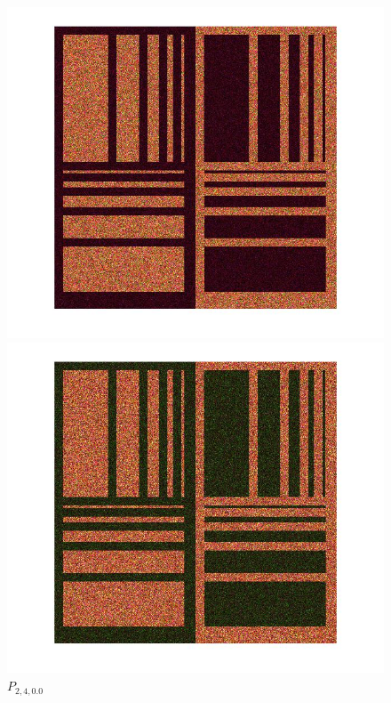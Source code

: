 \documentclass[12pt,a4paper]{article}
\begin{document}
\begin{figure}[!htb]
  \includegraphics[width=\linewidth]{Eq_Phantom_0p000_2_3_1.jpg}
	\caption{$P_{2,3,0.0}$}\label{fig:awesome_image1}
\endminipage\hfill
{}
  \includegraphics[width=\linewidth]{Eq_Phantom_0p000_2_4_1.jpg}
	\caption{$P_{2,4,0.0}$}\label{fig:awesome_image1}
\endminipage\hfill
{}%

\end{figure}
\end{document}
